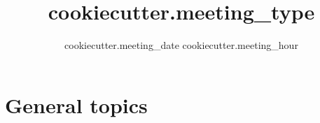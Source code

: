\documentclass{beamer}
\date{ {{ cookiecutter.meeting_date }} {{ cookiecutter.meeting_hour }} }
\title{
    {{ cookiecutter.meeting_type }}
}
\begin{document}
\beginframes

\section{General topics}
\end{document}
